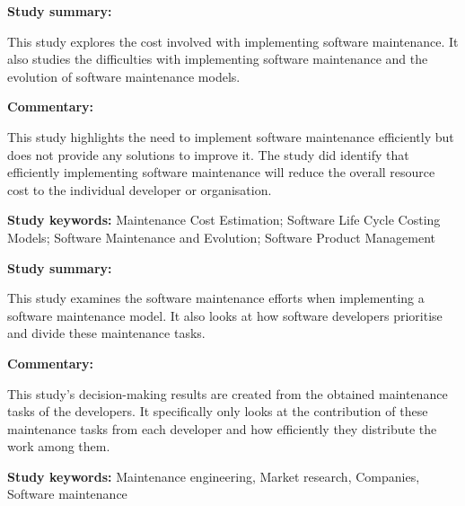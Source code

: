 \begin{tcolorbox}[colback=gray!5!white, colframe=deepblue!80!black, title=A cost model for software maintenance \& evolution\cite{Sneed2004}]
	\begin{minipage}[t]{0.25\textwidth}
		\textbf{Study summary:}
	\end{minipage}
	\hfill
	\begin{minipage}[t]{0.65\textwidth}
		This study explores the cost involved with implementing software maintenance. It also studies the difficulties with implementing software maintenance and the evolution of software maintenance models. 
	\end{minipage}

	\vspace{0.75em} 

	\begin{minipage}[t]{0.25\textwidth}
		\textbf{Commentary:}
	\end{minipage}
	\hfill
	\begin{minipage}[t]{0.65\textwidth}
		This study highlights the need to implement software maintenance efficiently but does not provide any solutions to improve it. The study did identify that efficiently implementing software maintenance will reduce the overall resource cost to the individual developer or organisation.
	\end{minipage}
	\tcblower
	\textbf{Study keywords:} Maintenance Cost Estimation; Software Life Cycle Costing Models; Software Maintenance and Evolution; Software Product Management
\end{tcolorbox}


\begin{tcolorbox}[colback=gray!5!white, colframe=deepblue!80!black, title=Trends in software maintenance tasks distribution among programmers: A study in a micro software company\cite{Stojanov2017}]
	\begin{minipage}[t]{0.25\textwidth}
		\textbf{Study summary:}
	\end{minipage}
	\hfill
	\begin{minipage}[t]{0.65\textwidth}
		This study examines the software maintenance efforts when implementing a software maintenance model. It also looks at how software developers prioritise and divide these maintenance tasks.
	\end{minipage}

	\vspace{0.75em} 

	\begin{minipage}[t]{0.25\textwidth}
		\textbf{Commentary:}
	\end{minipage}
	\hfill
	\begin{minipage}[t]{0.65\textwidth}
		This study's decision-making results are created from the obtained maintenance tasks of the developers. It specifically only looks at the contribution of these maintenance tasks from each developer and how efficiently they distribute the work among them.
	\end{minipage}
	\tcblower
	\textbf{Study keywords:} Maintenance engineering, Market research, Companies, Software maintenance
\end{tcolorbox}

